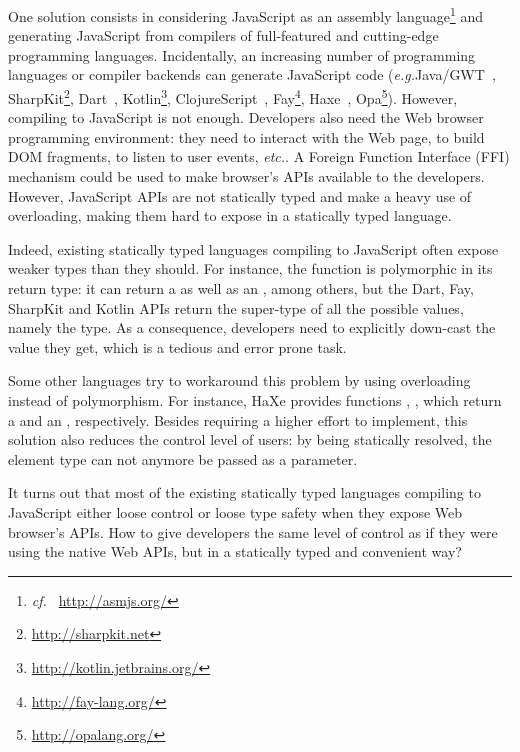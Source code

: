 \documentclass[runningheads,a4paper]{llncs}
\newcommand{\eg}{\emph{e.g.}}
\newcommand{\cf}{\emph{cf.~}}
\newcommand{\etc}{\emph{etc.}}
\begin{document}
One solution consists in considering JavaScript as an assembly language\footnote{\cf
\href{http://asmjs.org/}{http://asmjs.org/}} and generating JavaScript from compilers of full-featured and
cutting-edge programming languages. Incidentally, an increasing number of programming languages or compiler backends
can generate JavaScript code (\eg Java/GWT~\cite{Chaganti07_GWT},
SharpKit\footnote{\href{http://sharpkit.net}{http://sharpkit.net}}, Dart~\cite{Griffith11_Dart},
Kotlin\footnote{\href{http://kotlin.jetbrains.org/}{http://kotlin.jetbrains.org/}},
ClojureScript~\cite{McGranaghan11_ClojureScript}, Fay\footnote{\href{http://fay-lang.org/}{http://fay-lang.org/}},
Haxe~\cite{Cannasse08_HaXe}, Opa\footnote{\href{http://opalang.org/}{http://opalang.org/}}). 
However, compiling to JavaScript is not enough. Developers also need the Web browser programming environment: they
need to interact with the Web page, to build DOM fragments, to listen to user events, \etc. A Foreign Function
Interface (FFI) mechanism could be used to make browser’s APIs available to the developers. However, JavaScript APIs
are not statically typed and make a heavy use of overloading, making them hard to expose in a statically typed
language.

Indeed, existing statically typed languages compiling to JavaScript often expose weaker types than they should. For
instance, the function  is polymorphic in its return type: it can return a  as
well as an , among others, but the Dart, Fay, SharpKit and Kotlin APIs return the super-type of
all the possible values, namely the  type. As a consequence, developers need to explicitly down-cast
the value they get, which is a tedious and error prone task.

Some other languages try to workaround this problem by using overloading instead of polymorphism. For instance, HaXe
provides functions , , which return a  and an
, respectively. Besides requiring a higher effort to implement, this solution also reduces the
control level of users: by being statically resolved, the element type can not anymore be passed as a parameter.

It turns out that most of the existing statically typed languages compiling to JavaScript either loose control or
loose type safety when they expose Web browser’s APIs. How to give developers the same level of control as if they
were using the native Web APIs, but in a statically typed and convenient way?
\end{document}
